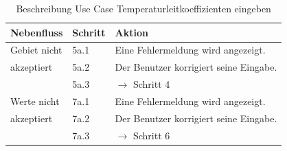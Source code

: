 \begin{table} [H]
\begin{tabular}{|l|l|l|}
		\textbf{Nebenfluss} & \textbf{Schritt} & \textbf{Aktion}\\
		\hline
		Gebiet nicht & 5a.1 & Eine Fehlermeldung wird angezeigt.\\
		\cline{2-3}
		akzeptiert 	& 5a.2	& Der Benutzer korrigiert seine Eingabe.\\
		\cline{2-3}
		& 5a.3 	& $\rightarrow$ Schritt 4\\
		\hline
		Werte nicht & 7a.1 	& Eine Fehlermeldung wird angezeigt.\\
		\cline{2-3}
		akzeptiert 	& 7a.2	& Der Benutzer korrigiert seine Eingabe.\\
		\cline{2-3}
		& 7a.3 	& $\rightarrow$ Schritt 6\\
		\hline
	\end{tabular}
	\caption{Beschreibung Use Case Temperaturleitkoeffizienten eingeben}
	\label{Beschreibung Use Case Temperaturleitkoeffizienten eingeben}
\end{table}

